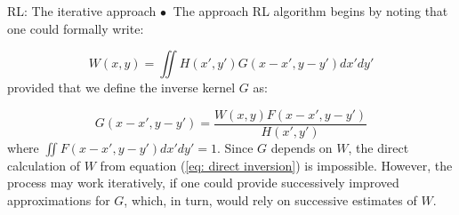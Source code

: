 \documentclass [aspectratio=169]{beamer}
\begin{document}
\begin{frame}{RL: The iterative approach}
$\bullet~$  The approach RL algorithm begins by noting that one could formally write:  

\begin{equation}
W(x,y)=\iint H(x',y') G(x-x',y-y') dx' dy' \label{eq: direct inversion}
\end{equation}
provided that we define the inverse kernel $G$ as:

\begin{equation}
G(x-x',y-y')=\frac{W(x,y) F(x-x',y-y')}{H(x',y')} \label{eq: G ideal}  
\end{equation}
where $\iint F(x-x',y-y') dx' dy' = 1$. Since $G$ depends on $W$, the direct calculation of $W$ from equation (\ref{eq: direct inversion}) is impossible. However, the process may work iteratively, if one could provide successively improved approximations for $G$, which, in turn, would rely on successive estimates of $W$. 

 \end{frame}
 
\end{document}
